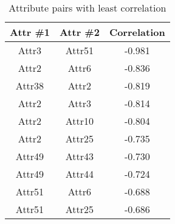 \begin{table}[H]
\centering
\begin{tabular}{cc|c}
     \textbf{Attr \#1}&\textbf{Attr \#2} &\textbf{Correlation} \\ \hline
     Attr3 & Attr51 & -0.981 \\
     Attr2 & Attr6 & -0.836 \\
     Attr38 & Attr2 & -0.819 \\
     Attr2 & Attr3 & -0.814 \\
     Attr2 & Attr10 & -0.804 \\
     Attr2 & Attr25 & -0.735 \\
     Attr49 & Attr43 & -0.730 \\
     Attr49 & Attr44 & -0.724 \\
     Attr51 & Attr6 & -0.688 \\
     Attr51 & Attr25 & -0.686 \\
    
\end{tabular}
\caption{\label{tab::least_correlation} Attribute pairs with least correlation}
\end{table}


